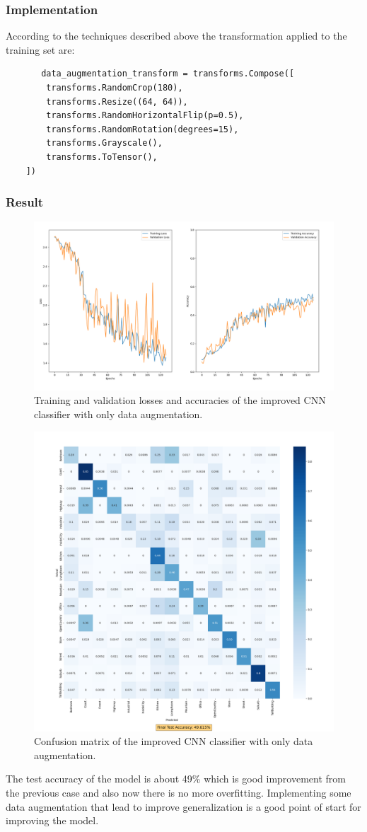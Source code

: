 \documentclass[12pt, a4paper, italian]{scrartcl}
\begin{document}
  \subsubsection{Implementation}
  According to the techniques described above the transformation applied to the training set are:
   \begin{verbatim} 
       data_augmentation_transform = transforms.Compose([
        transforms.RandomCrop(180),              
        transforms.Resize((64, 64)),
        transforms.RandomHorizontalFlip(p=0.5),       
        transforms.RandomRotation(degrees=15),  
        transforms.Grayscale(),
        transforms.ToTensor(),  
    ])
   \end{verbatim}
   
   \newpage
    \subsubsection{Result}
             \begin{figure} [h!]
 \centering
  { \includegraphics[width=.65\textwidth]{fig/loss_and_accuracy_task_2_individual_network_aug.png} \caption{Training and validation losses and accuracies of the improved CNN classifier with only data augmentation.
}} 
  \end{figure}
  \begin{figure} [h!!!]
 \centering
  { \includegraphics[width=.70\textwidth]{fig/confusion_matrix_task_2_individual_network_aug.png} \caption{Confusion matrix of the improved CNN classifier with only data augmentation.
}} 
  \end{figure}  
The test accuracy of the model is about 49\% which is good improvement from the previous case and also now there is no more overfitting.
Implementing some data augmentation that lead to improve generalization is a good point of start for improving the model.
\end{document}
